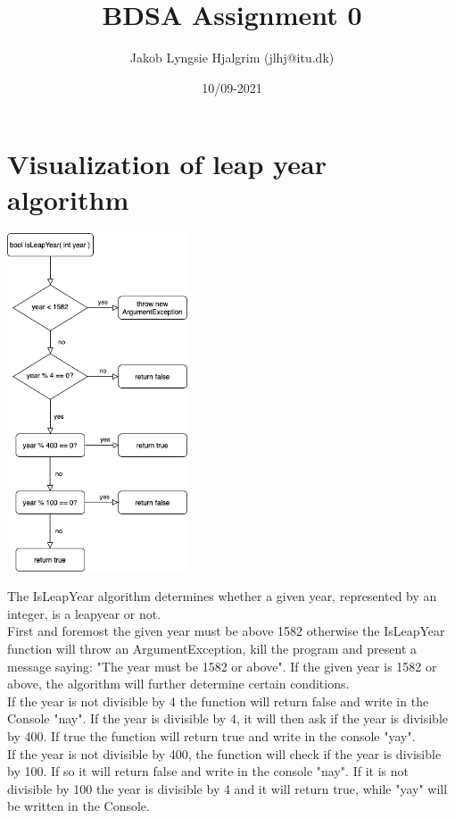 \documentclass{article}
\title{BDSA Assignment 0}
\author{Jakob Lyngsie Hjalgrim (jlhj@itu.dk)}
\date{10/09-2021}
\begin{document}
\maketitle

\section{Visualization of leap year algorithm}
\begin{center}
\includegraphics[width=0.4\textwidth]{leapyear_flowchart.png}
\end{center}
The IsLeapYear algorithm determines whether a given year, represented by an integer,
is a leapyear or not. \\
First and foremost the given year must be above 1582 otherwise the IsLeapYear function will throw an ArgumentException, kill the program and present a message saying: "The year must be 1582 or above". If the given year is 1582 or above, the algorithm will further determine certain conditions. \\
If the year is not divisible by 4 the function will return false and write in the Console "nay". If the year is divisible by 4, it will then ask if the year is divisible by 400. If true the function will return true and write in the console "yay".\\
If the year is not divisible by 400, the function will check if the year is divisible by 100. If so it will return false and write in the console "nay". If it is not divisible by 100 the year is divisible by 4 and it will return true, while "yay" will be written in the Console.
\end{document}
